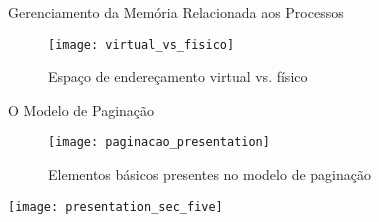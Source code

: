 \documentclass[xcolor={usenames,svgnames,dvipsnames},brazil,english,12pt,aspectratio=149]{beamer}
\begin{document}
\begin{frame}{Gerenciamento da Memória Relacionada aos Processos}
  \begin{figure}[!h]
    \centering
    \texttt{[image: virtual\_vs\_fisico]} 
    \caption*{Espaço de endereçamento virtual vs. físico}
  \end{figure}
\end{frame}


\begin{frame}{O Modelo de Paginação}
  \begin{figure}[!h]
    \centering
    \texttt{[image: paginacao\_presentation]} 
    \caption*{Elementos básicos presentes no modelo de paginação}
  \end{figure}
\end{frame}


%
%

\begin{frame}[plain]
  \texttt{[image: presentation\_sec\_five]}
\end{frame}
\end{document}
